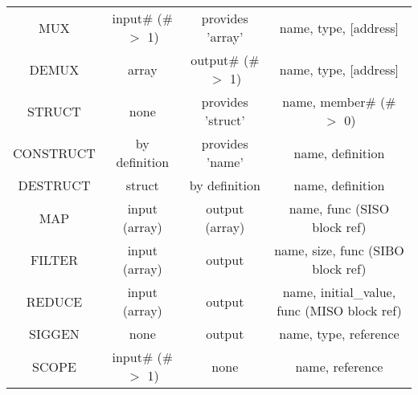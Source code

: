 \documentclass{article}
\begin{document}
\begin{longtable}[c]{ |c|c|c|c| }
    \hline
    MUX & input\# (\# $>$ 1) & provides 'array' & name, type, [address] \\
    DEMUX & array & output\# (\# $>$ 1) & name, type, [address] \\
    STRUCT & none & provides 'struct' & name, member\# (\# $>$ 0) \\
    CONSTRUCT & by definition & provides 'name' & name, definition \\
    DESTRUCT & struct & by definition & name, definition \\
    \hline
    MAP & input (array) & output (array) & name, func (SISO block ref) \\
    FILTER & input (array) & output & name, size, func (SIBO block ref) \\
    REDUCE & input (array) & output & name, initial\_value, func (MISO block ref) \\
    \hline
    SIGGEN & none & output & name, type, reference \\
    SCOPE & input\# (\# $>$ 1) & none & name, reference \\
\end{longtable}
\end{document}
